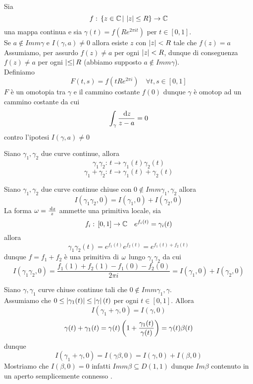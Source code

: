 \spazio
\begin{prop}Sia 
$$ f:\, \{ z\in \mathbb{C} \, \vert \,\left\vert z \right\vert \leq R \} \to \mathbb{C}$$
una mappa continua e sia $\gamma(t) = f(Re^{2\pi i t})$ per $t\in [0,1]$.\\
Se $a\not\in Imm\gamma$ e $I(\gamma,a) \neq 0 $ allora esiste $z$ con $\left\vert z \right\vert <R$ tale che $f(z) = a$
\proof Assumiamo, per assurdo $f(z) \neq a$ per ogni $\left\vert z \right\vert <R$, dunque di conseguenza $f(z) \neq a$ per ogni $\left\vert \leq \right\vert R$ (abbiamo supposto $a\not \in Imm \gamma$).\\
Definiamo 
$$ F(t,s) = f(tRe^{2\pi i }) \quad \forall t,s\in [0,1]$$
$F$ \`e un omotopia tra $\gamma $ e il cammino costante $f(0)$ dunque $\gamma $ \`e omotop ad un cammino costante da cui 
$$ \int_\gamma \frac{\, \mathrm{d}z}{z-a} = 0$$
contro l'ipotesi $I(\gamma, a) \neq 0 $
\end{prop}
\newpage
\begin{defn}Siano $\gamma_1, \gamma_2$ due curve continue, allora
$$ \gamma_1\gamma_2:\, t \to \gamma_1(t) \gamma_2(t)$$
$$ \gamma_1+ \gamma_2 :\, t\to \gamma_1(t)+\gamma_2(t)$$
\end{defn}
\begin{thm}Siano $\gamma_1,\gamma_2$ due curve continue chiuse con $0\not \in Imm \gamma_1, \gamma_2$ allora 
$$I(\gamma_1\gamma_2,0) =I(\gamma_1,0)+ I(\gamma_2,0)$$
\proof La forma $\omega=\frac{\, \mathrm{d}z}{z}$ ammette una primitiva locale, sia 
$$f_i:\, [0,1]\to \mathbb{C} \quad e^{f_i(t)} =\gamma_i(t)$$
allora $$\gamma_1\gamma_2(t) =e^{f_1(t)} e^{f_2(t)} = e^{f_1(t) + f_2(t)}$$
dunque $f=f_1+f_2$ \`e una primitiva di $\omega$ lungo $\gamma_1\gamma_2$ da cui 
$$ I(\gamma_1\gamma_2,0) = \frac{f_1(1) +f_2(1) - f_1(0) - f_2(0)}{2\pi i} = I(\gamma_1,0) +I(\gamma_2,0)$$
\end{thm}
\begin{thm}Siano $\gamma,\gamma_1$ curve chiuse continue tali che $0\not \in Imm\gamma_1,\gamma$.\\
Assumiamo che $0\leq \left\vert \gamma_1(t) \right\vert\leq\left\vert \gamma \right\vert(t)$ per ogni $t\in [0,1]$. Allora
$$ I(\gamma_1+\gamma,0) = I(\gamma,0)$$
\proof 
$$ \gamma(t) +\gamma_1(t) = \gamma(t) \left( 1+\frac{\gamma_1(t)}{\gamma(t)} \right)  =\gamma(t) \beta(t)$$
dunque 
$$ I(\gamma_1+\gamma,0) = I(\gamma\beta,0) =I(\gamma,0) + I(\beta,0)$$
Mostriamo che $I(\beta,0)=0$ infatti $Imm \beta \subseteq D(1,1)$ dunque $Im \beta $ contenuto in un aperto  semplicemente connesso .\endproof
\end{thm}
\spazio
